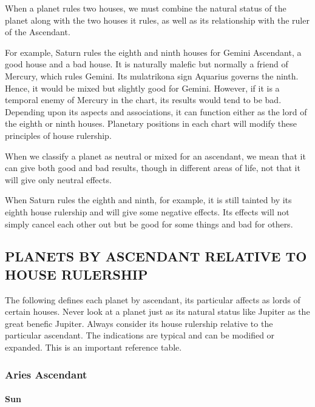 When a planet rules two houses, we must combine the natural status of the planet along with the two houses it rules, as well as its relationship with the ruler of the Ascendant.

 

For example, Saturn rules the eighth and ninth houses for Gemini Ascendant, a good house and a bad house. It is naturally malefic but normally a friend of Mercury, which rules Gemini. Its mulatrikona sign Aquarius governs the ninth. Hence, it would be mixed but slightly good for Gemini. However, if it is a temporal enemy of Mercury in the chart, its results would tend to be bad. Depending upon its aspects and associations, it can function either as the lord of the eighth or ninth houses. Planetary positions in each chart will modify these principles of house rulership.

 

When we classify a planet as neutral or mixed for an ascendant, we mean that it can give both good and bad results, though in different areas of life, not that it will give only neutral effects.

 

When Saturn rules the eighth and ninth, for example, it is still tainted by its eighth house rulership and will give some negative effects. Its effects will not simply cancel each other out but be good for some things and bad for others.



\subsection{PLANETS BY ASCENDANT RELATIVE TO HOUSE RULERSHIP}
 

The following defines each planet by ascendant, its particular affects as lords of certain houses. Never look at a planet just as its natural status like Jupiter as the great benefic Jupiter. Always consider its house rulership relative to the particular ascendant. The indications are typical and can be modified or expanded. This is an important reference table.

 

\subsubsection{Aries Ascendant}
 

\paragraph{Sun}

